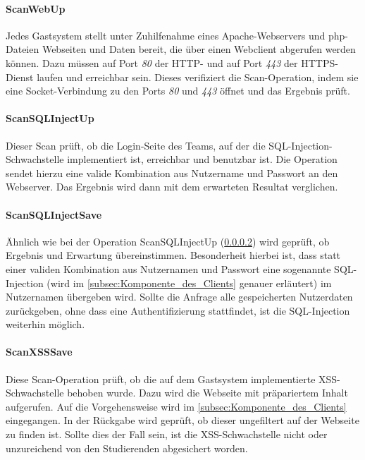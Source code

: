 \paragraph{ScanWebUp}\label{para:ScanWebUp}
Jedes Gastsystem stellt unter Zuhilfenahme eines Apache-Webservers und php-Dateien Webseiten und Daten bereit, die über einen Webclient abgerufen werden können. Dazu müssen auf Port \textit{80} der HTTP- und auf Port \textit{443} der HTTPS-Dienst laufen und erreichbar sein. Dieses verifiziert die Scan-Operation, indem sie eine Socket-Verbindung zu den Ports \textit{80} und \textit{443} öffnet und das Ergebnis prüft.

\paragraph{ScanSQLInjectUp}\label{para:ScanSQLInjectUp}
Dieser Scan prüft, ob die Login-Seite des Teams, auf der die SQL-Injection-Schwachstelle implementiert ist, erreichbar und benutzbar ist. Die Operation sendet hierzu eine valide Kombination aus Nutzername und Passwort an den Webserver. Das Ergebnis wird dann mit dem erwarteten Resultat verglichen.

\paragraph{ScanSQLInjectSave}\label{para:ScanSQLInjectSave}
Ähnlich wie bei der Operation ScanSQLInjectUp (\ref{para:ScanSQLInjectUp}) wird geprüft, ob Ergebnis und Erwartung übereinstimmen. Besonderheit hierbei ist, dass statt einer validen Kombination aus Nutzernamen und Passwort eine sogenannte SQL-Injection (wird im \autoref{subsec:Komponente_des_Clients} genauer erläutert) im Nutzernamen übergeben wird.  
Sollte die Anfrage alle gespeicherten Nutzerdaten zurückgeben, ohne dass eine Authentifizierung stattfindet, ist die SQL-Injection weiterhin möglich.

\paragraph{ScanXSSSave}\label{para:ScanXSSSave}
Diese Scan-Operation prüft, ob die auf dem Gastsystem implementierte XSS-Schwachstelle behoben wurde. Dazu wird die Webseite mit präpariertem Inhalt aufgerufen. Auf die Vorgehensweise wird im \autoref{subsec:Komponente_des_Clients} eingegangen.
In der Rückgabe wird geprüft, ob dieser ungefiltert auf der Webseite zu finden ist. Sollte dies der Fall sein, ist die XSS-Schwachstelle nicht oder unzureichend von den Studierenden abgesichert worden.

